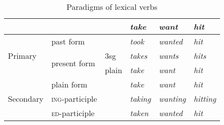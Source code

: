 \documentclass[UTF8, a4paper, oneside, scheme=plain, 12pt]{ctexbook}
\newcommand{\form}[1]{\emph{#1}}
\newcommand{\formcat}[1]{\textsc{#1}}
\begin{document}
\begin{table}[H]
    \caption{Paradigms of lexical verbs}
    \label{tbl:lexical-inflection}
    \centering
    \begin{tabular}{@{}llllll@{}}
    \toprule
    \multicolumn{1}{l}{}       &                               &       & \form{take}   & \form{want}    & \form{hit}     \\ \midrule
    \multirow{3}{*}{Primary}   & past form                     &       & \form{took}   & \form{wanted}  & \form{hit}     \\
                               & \multirow{2}{*}{present form} & 3sg   & \form{takes}  & \form{wants}   & \form{hits}    \\
                               &                               & plain & \form{take}   & \form{want}    & \form{hit}     \\ \midrule
    \multirow{3}{*}{Secondary} & plain form                    &       & \form{take}   & \form{want}    & \form{hit}     \\
                               & \formcat{ing}-participle       &       & \form{taking} & \form{wanting} & \form{hitting} \\
                               & \formcat{ed}-participle        &       & \form{taken}  & \form{wanted}  & \form{hit}     \\ \bottomrule
    \end{tabular}
\end{table}
\end{document}

